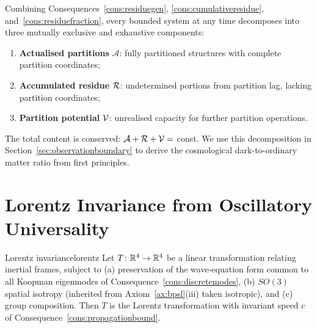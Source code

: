 \begin{remark}
Combining Consequences~\ref{cons:residuegen}, \ref{cons:cumulativeresidue}, and~\ref{cons:residuefraction}, every bounded system at any time decomposes into three mutually exclusive and exhaustive components:
\begin{enumerate}[nosep,label=(\roman*)]
\item \textbf{Actualised partitions} $\mathcal{A}$: fully partitioned structures with complete partition coordinates;
\item \textbf{Accumulated residue} $\mathcal{R}$: undetermined portions from partition lag, lacking partition coordinates;
\item \textbf{Partition potential} $\mathcal{V}$: unrealised capacity for further partition operations.
\end{enumerate}
The total content is conserved: $\mathcal{A}+\mathcal{R}+\mathcal{V}=$ const. We use this decomposition in Section~\ref{sec:observationboundary} to derive the cosmological dark-to-ordinary matter ratio from first principles.
\end{remark}

\section{Lorentz Invariance from Oscillatory Universality}
\label{sec:lorentz}

\begin{consequence}{Lorentz invariance}{lorentz}
Let $T\colon\mathbb{R}^{4}\to\mathbb{R}^{4}$ be a linear transformation relating inertial frames, subject to (a) preservation of the wave-equation form common to all Koopman eigenmodes of Consequence~\ref{cons:discretemodes}, (b) $SO(3)$ spatial isotropy (inherited from Axiom~\ref{ax:bpsl}(iii) taken isotropic), and (c) group composition. Then $T$ is the Lorentz transformation with invariant speed $c$ of Consequence~\ref{cons:propagationbound}.
\end{consequence}

